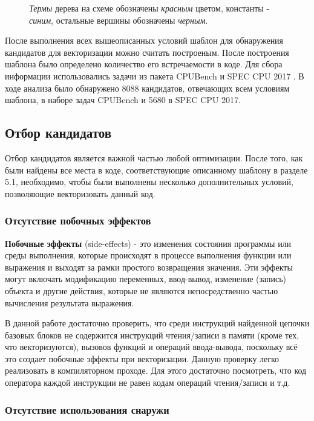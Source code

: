 \begin{figure}[!htb]
    \centering
    
    \caption{\textit{Термы} дерева на схеме обозначены \textit{красным} цветом, константы - \textit{синим}, остальные вершины обозначены \textit{черным}.}
    \label{termtree}
\end{figure}

После выполнения всех вышеописанных условий шаблон для обнаружения кандидатов для векторизации можно считать построеным. После построения шаблона было определено количество его встречаемости в коде. Для сбора информации использовались задачи из пакета CPUBench \cite{lu2023cpubench} и SPEC CPU 2017 \cite{bucek2018spec}. В ходе анализа было обнаружено 8088 кандидатов, отвечающих всем условиям шаблона, в наборе задач CPUBench и 5680 в SPEC CPU 2017.

\subsection{Отбор кандидатов}

Отбор кандидатов является важной частью любой оптимизации. После того, как были найдены все места в коде, соответствующие описанному шаблону в разделе 5.1, необходимо, чтобы были выполнены несколько дополнительных условий, позволяющие векторизовать данный код.

\subsubsection{Отсутствие побочных эффектов}

\textbf{Побочные эффекты} (side-effects) - это изменения состояния программы или среды выполнения, которые происходят в процессе выполнения функции или выражения и выходят за рамки простого возвращения значения. Эти эффекты могут включать модификацию переменных, ввод-вывод, изменение (запись) объекта и другие действия, которые не являются непосредственно частью вычисления результата выражения.

В данной работе достаточно проверить, что среди инструкций найденной цепочки базовых блоков не содержится инструкций чтения/записи в памяти (кроме тех, что векторизуются), вызовов функций и операций ввода-вывода, поскольку всё это создает побочные эффекты при векторизации. Данную проверку легко реализовать в компиляторном проходе. Для этого достаточно посмотреть, что код оператора каждой инструкции не равен кодам операций чтения/записи и т.д. 

\subsubsection{Отсутствие использования снаружи}

